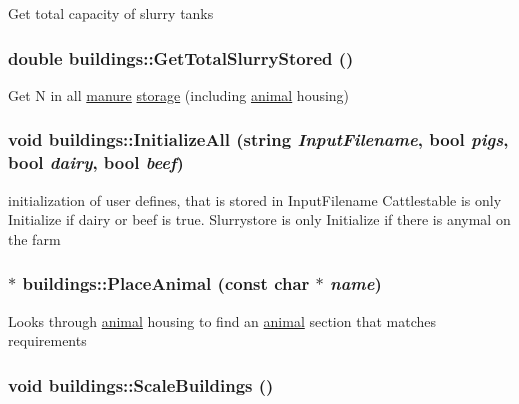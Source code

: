 Get total capacity of slurry tanks \hypertarget{classbuildings_a02b582aacb2a1b00464c501a3a5635ff}{
\subsubsection[{GetTotalSlurryStored}]{\setlength{\rightskip}{0pt plus 5cm}double buildings::GetTotalSlurryStored ()}}
\label{classbuildings_a02b582aacb2a1b00464c501a3a5635ff}
Get N in all \hyperlink{classmanure}{manure} \hyperlink{classstorage}{storage} (including \hyperlink{classanimal}{animal} housing) \hypertarget{classbuildings_aed6e79504b2bb19179d9aa4a06e1ba02}{
\subsubsection[{InitializeAll}]{\setlength{\rightskip}{0pt plus 5cm}void buildings::InitializeAll (string {\em InputFilename}, \/  bool {\em pigs}, \/  bool {\em dairy}, \/  bool {\em beef})}}
\label{classbuildings_aed6e79504b2bb19179d9aa4a06e1ba02}
initialization of user defines, that is stored in InputFilename Cattlestable is only Initialize if dairy or beef is true. Slurrystore is only Initialize if there is anymal on the farm \hypertarget{classbuildings_af2943b86173a6a6049c4d52b9793e36e}{
\subsubsection[{PlaceAnimal}]{ $\ast$ buildings::PlaceAnimal (const char $\ast$ {\em name})}}
\label{classbuildings_af2943b86173a6a6049c4d52b9793e36e}
Looks through \hyperlink{classanimal}{animal} housing to find an \hyperlink{classanimal}{animal} section that matches requirements \hypertarget{classbuildings_a4801905be37d8b7a0ea0487879a79cc3}{
\subsubsection[{ScaleBuildings}]{\setlength{\rightskip}{0pt plus 5cm}void buildings::ScaleBuildings ()}}
